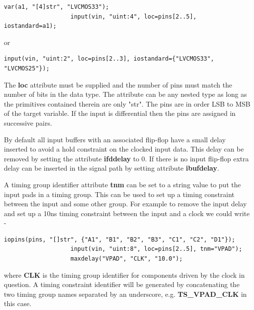            \begin{lstlisting}[gobble=12, language=threepl]
                   var(a1, "[4]str", "LVCMOS33");
                   input(vin, "uint:4", loc=pins[2..5], iostandard=a1);
            \end{lstlisting}
            
            or
            \begin{lstlisting}[gobble=12, language=threepl]
                   input(vin, "uint:2", loc=pins[2..3], iostandard={"LVCMOS33", "LVCMOS25"});
            \end{lstlisting}
                        
            The {\bf loc} attribute must be supplied and the number of pins must
            match the number of bits in the data type. The attribute can be any
            nested type as long as the primitives contained therein are only "str".
            The pins are in order LSB to MSB of the target variable. If the input
            is differential then the pins are assigned in successive pairs.

            By default all input buffers with an associated flip-flop have a small
            delay inserted to avoid a hold constraint on the clocked input data.
            This delay can be removed by setting the attribute {\bf ifddelay} to 0.
            If there is no input flip-flop extra delay can be inserted in the
            signal path by setting attribute {\bf ibufdelay}.
            
            A timing group identifier attribute {\bf tnm} can be set to a string
            value to put the input pads in a timing group. This can be used to set
            up a timing constraint between the input and some other group. For
            example to remove the input delay and set up a 10ns timing constraint
            between the input and a clock we could write -
            \begin{lstlisting}[gobble=12, language=threepl]
                   iopins(pins, "[]str", {"A1", "B1", "B2", "B3", "C1", "C2", "D1"});
                   input(vin, "uint:8", loc=pins[2..5], tnm="VPAD");
                   maxdelay("VPAD", "CLK", "10.0");
            \end{lstlisting}
            where {\bf CLK} is the timing group identifier for components driven by
            the clock in question. A timing constraint identifier will be
            generated by concatenating the two timing group names separated by an
            underscore, e.g.  {\bf TS\_VPAD\_CLK} in this case.

